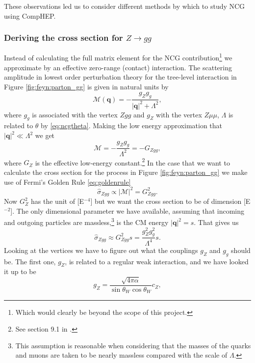 These observations led us to consider different methods by which to study NCG using CompHEP.

\subsubsection{Deriving the cross section for $Z \rightarrow gg$}
Instead of calculating the full matrix element for the NCG contribution\footnote{Which would clearly be beyond the scope of this project.} we approximate by an effective zero-range (contact) interaction. The scattering amplitude in lowest order perturbation theory for the tree-level interaction in Figure \ref{fig:feyn:parton_gg} is given in natural units by
\begin{equation}
	\mathcal{M}(\mathbf{q}) = -\frac{g_Z g_g }{|\mathbf{q}|^2 + \Lambda^2},
\end{equation}
where $g_g$ is associated with the vertex $Zgg$ and $g_Z$ with the vertex $Z\mu\mu$, $\Lambda$ is related to $\theta$ by \eqref{eq:ncgtheta}. Making the low energy approximation that $|\mathbf{q}|^2 \ll \Lambda^2$ we get
\begin{equation} \label{eq:scatteringamplitude}
	\mathcal{M} = -\frac{g_Z g_g}{\Lambda^2} = -G_{Zgg},
\end{equation}
where $G_Z$ is the effective low-energy constant.\footnote{See section 9.1 in \cite{martin1998pp}.} In the case that we want to calculate the cross section for the process in Figure \ref{fig:feyn:parton_gg} we make use of Fermi's Golden Rule \eqref{eq:goldenrule}
\begin{equation}
	\hat \sigma_{Zgg} \propto |\mathcal{M}|^2 = G_{Zgg}^2.
\end{equation}
Now $G_Z^2$ has the unit of [E$^{-4}$] but we want the cross section to be of dimension [E$^{-2}$]. The only dimensional parameter we have available, assuming that incoming and outgoing particles are massless,\footnote{This assumption is reasonable when considering that the masses of the quarks and muons are taken to be nearly massless compared with the scale of $\Lambda$.} is the CM energy $|\mathbf{q}|^2 = s$. That gives us
\begin{equation}
	\hat \sigma_{Zgg} \approx G_{Zgg}^2 s = \frac{g_Z^2 g_g^2}{\Lambda^4}s.
\end{equation}
Looking at the vertices we have to figure out what the couplings $g_Z$ and $g_g$ should be. The first one, $g_Z$, is related to a regular weak interaction, and we have looked it up to be \cite{bettini2008iep}
\begin{equation}
	g_Z = \frac{\sqrt{4\pi\alpha}}{\sin{\theta_W}\cos{\theta_W}} c_Z,
\end{equation}
